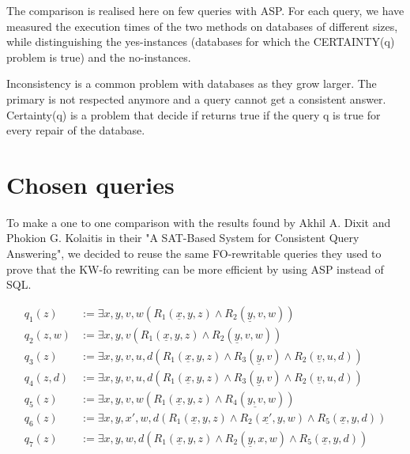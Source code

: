 \documentclass[acmsmall]{acmart}
\begin{document}
\begin{CCSXML}
The comparison is realised here on few queries with ASP. For each query, we
have measured the execution times of the two methods on databases of different
sizes, while distinguishing the yes-instances (databases for which the
CERTAINTY(q) problem is true) and the no-instances.

	Inconsistency is a common problem with databases as they grow larger. The primary is not respected anymore and a query cannot get a consistent answer. Certainty(q) is a problem that decide if returns true if the query q is true for every repair of the database.




\section{Chosen queries}

To make a one to one comparison with the results found by Akhil A. Dixit and
Phokion G. Kolaitis in their "A SAT-Based System for Consistent Query
Answering", we decided to reuse the same FO-rewritable queries they used to
prove that the KW-fo rewriting can be more efficient by using ASP instead of
SQL.

\begin{align*}
	q_1(z)   &:= \exists x,y,v,w (R_1(\underline{x},y,z) \wedge R_2(\underline{y}, v, w))\\
	q_2(z,w) &:= \exists x,y,v (R_1(\underline{x},y,z) \wedge R_2(\underline{y},v,w))\\
	q_3(z)   &:= \exists x,y,v,u,d (R_1(\underline{x},y,z) \wedge R_3(\underline{y},v) \wedge R_2(\underline{v},u,d))\\
	q_4(z,d) &:= \exists x,y,v,u,d (R_1(\underline{x},y,z) \wedge R_3(\underline{y},v) \wedge R_2(\underline{v},u,d))\\
	q_5(z)   &:= \exists x,y,v,w (R_1(\underline{x},y,z) \wedge R_4(\underline{y,v},w))\\
	q_6(z)   &:= \exists x,y,x',w,d (R_1(\underline{x},y,z) \wedge R_2(\underline{x'},y,w) \wedge R_5(\underline{x},y,d))\\
	q_7(z)   &:= \exists x,y,w,d (R_1(\underline{x},y,z) \wedge R_2(\underline{y},x,w) \wedge R_5(\underline{x},y,d))\\
\end{align*}





\end{CCSXML}
\end{document}
